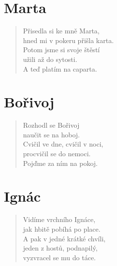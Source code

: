\section*{Marta}
\begin{verse}
Přisedla si ke mně Marta,\\
hned mi v pokeru přišla karta.\\
Potom jsme si svoje štěstí\\
užili až do sytosti.\\
A teď platím na caparta.
\end{verse}    

\section*{Bořivoj}
\begin{verse}
Rozhodl se Bořivoj\\
naučit se na hoboj.\\
Cvičil ve dne, cvičil v noci,\\
procvičil se do nemoci.\\
Pojďme za ním na pokoj.
\end{verse}    

\section*{Ignác}
\begin{verse}
Vidíme vrchního Ignáce,\\
jak hbitě pobíhá po place.\\
A pak v jedné krátké chvíli,\\
jeden z hostů, podnapilý,\\
vyzvracel se mu do táce.
\end{verse}    
